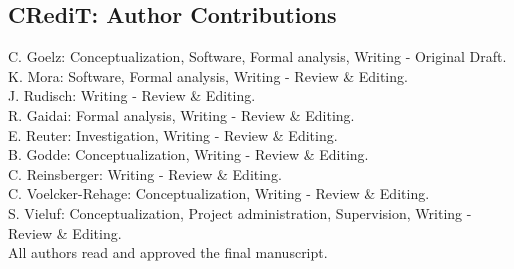 \subsection*{CRediT: Author Contributions}
C. Goelz: Conceptualization, Software, Formal analysis, Writing - Original Draft.\\
K. Mora: Software, Formal analysis, Writing - Review \& Editing.\\
J. Rudisch: Writing - Review \& Editing.\\
R. Gaidai: Formal analysis, Writing - Review \& Editing.\\ 
E. Reuter: Investigation, Writing - Review \& Editing.\\
B. Godde: Conceptualization, Writing - Review \& Editing.\\ 
C. Reinsberger: Writing - Review \& Editing.\\
C. Voelcker-Rehage: Conceptualization, Writing - Review \& Editing.\\ 
S. Vieluf: Conceptualization, Project administration, Supervision, Writing - Review \& Editing.\\
All authors read and approved the final manuscript.
